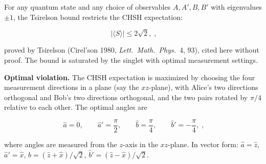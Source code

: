 For any quantum state and any choice of observables $A, A', B, B'$ with eigenvalues $\pm 1$, the Tsirelson bound restricts the CHSH expectation:
\begin{linenomath}
\begin{equation}
\boxed{\;
\lvert\langle S\rangle\rvert \le 2\sqrt{2},
\;},
\label{eq:tsirelson-bound}
\end{equation}
\end{linenomath}
proved by Tsirelson (Cirel'son 1980, \textit{Lett.\ Math.\ Phys.}\ 4, 93), cited here without proof. The bound is saturated by the singlet with optimal measurement settings.

\medskip\noindent\textbf{Optimal violation.}
The CHSH expectation is maximized by choosing the four measurement directions in a plane (say the $xz$-plane), with Alice's two directions orthogonal and Bob's two directions orthogonal, and the two pairs rotated by $\pi/4$ relative to each other. The optimal angles are
\begin{linenomath}
\begin{equation}
\boxed{\;
\hat{a} = 0,\qquad
\hat{a}' = \frac{\pi}{2},\qquad
\hat{b} = \frac{\pi}{4},\qquad
\hat{b}' = -\frac{\pi}{4},
\;},
\label{eq:optimal-violation}
\end{equation}
\end{linenomath}
where angles are measured from the $z$-axis in the $xz$-plane. In vector form: $\hat{a} = \hat{z}$, $\hat{a}' = \hat{x}$, $\hat{b} = (\hat{z} + \hat{x})/\sqrt{2}$, $\hat{b}' = (\hat{z} - \hat{x})/\sqrt{2}$.

